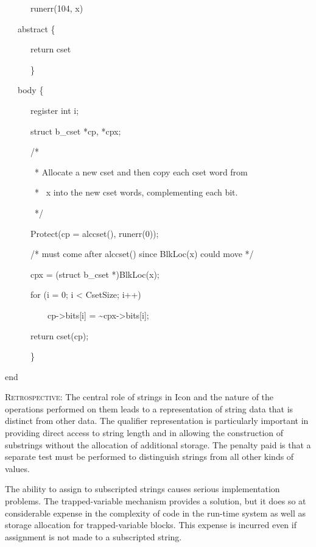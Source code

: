 {\ttfamily\mdseries
\ \ \ \ \ \ runerr(104, x)}


\bigskip

{\ttfamily\mdseries
\ \ \ abstract \{}

{\ttfamily\mdseries
\ \ \ \ \ \ return cset}

{\ttfamily\mdseries
\ \ \ \ \ \ \}}

{\ttfamily\mdseries
\ \ \ body \{}

{\ttfamily\mdseries
\ \ \ \ \ \ register int i;}

{\ttfamily\mdseries
\ \ \ \ \ \ struct b\_cset *cp, *cpx;}


\bigskip

{\ttfamily\mdseries
\ \ \ \ \ \ /*}

{\ttfamily\mdseries
\ \ \ \ \ \ \ * Allocate a new cset and then copy each cset word from}

{\ttfamily\mdseries
\ \ \ \ \ \ \ * \ x into the new cset words, complementing each bit.}

{\ttfamily\mdseries
\ \ \ \ \ \ \ */}

{\ttfamily\mdseries
\ \ \ \ \ \ Protect(cp = alccset(), runerr(0));}

{\ttfamily\mdseries
\ \ \ \ \ \ /* must come after alccset() since BlkLoc(x) could move */}

{\ttfamily\mdseries
\ \ \ \ \ \ cpx = (struct b\_cset *)BlkLoc(x); }

{\ttfamily\mdseries
\ \ \ \ \ \ for (i = 0; i {\textless} CsetSize; i++) }

{\ttfamily\mdseries
\ \ \ \ \ \ \ \ \ \ cp-{\textgreater}bits[i] = \~{}cpx-{\textgreater}bits[i];}

{\ttfamily\mdseries
\ \ \ \ \ \ return cset(cp);}

{\ttfamily\mdseries
\ \ \ \ \ \ \}}

{\ttfamily\mdseries
end}


\textsc{Retrospective}: The central role of strings in Icon and the
nature of the operations performed on them leads to a representation
of string data that is distinct from other data. The qualifier
representation is particularly important in providing direct access to
string length and in allowing the construction of substrings without
the allocation of additional storage. The penalty paid is that a
separate test must be performed to distinguish strings from all other
kinds of values.

The ability to assign to subscripted strings causes serious
implementation problems. The trapped-variable mechanism provides a
solution, but it does so at considerable expense in the complexity of
code in the run-time system as well as storage allocation for
trapped-variable blocks. This expense is incurred even if assignment
is not made to a subscripted string.

